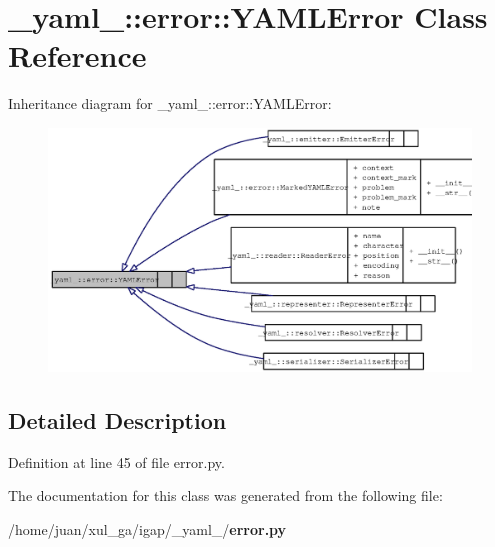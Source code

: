 \section{\_\-yaml\_\-::error::YAMLError Class Reference}
\label{class__yaml___1_1error_1_1YAMLError}
Inheritance diagram for \_\-yaml\_\-::error::YAMLError:\nopagebreak
\begin{figure}[H]
\begin{center}
\leavevmode
\includegraphics[width=400pt]{class__yaml___1_1error_1_1YAMLError__inherit__graph}
\end{center}
\end{figure}


\subsection{Detailed Description}


Definition at line 45 of file error.py.

The documentation for this class was generated from the following file:\begin{CompactItemize}
\item 
/home/juan/xul\_\-ga/igap/\_\-yaml\_\-/{\bf error.py}\end{CompactItemize}
